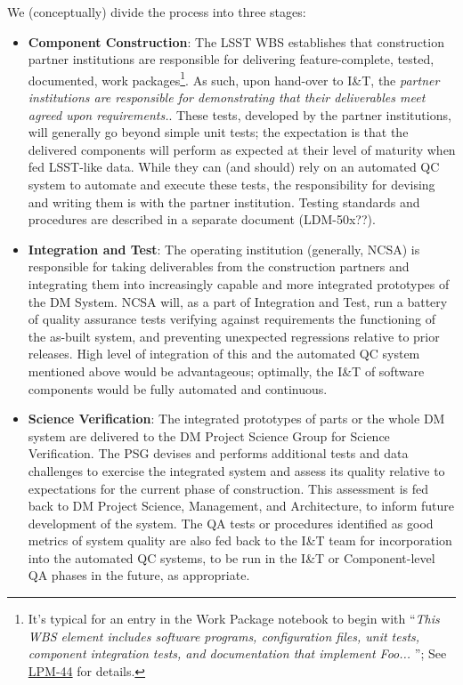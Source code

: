 We (conceptually) divide the process into three stages:
%
\begin{itemize}

\item {\bf Component Construction}: The LSST WBS establishes that construction
partner institutions are responsible for delivering feature-complete,
tested, documented, work packages\footnote{It's typical for an entry in the
Work Package notebook to begin with ``{\em This WBS element includes
software programs, configuration files, unit tests, component integration
tests, and documentation that implement Foo...  }''; See
\href{http://ls.st/LPM-44)}{LPM-44} for details.}.  As such, upon hand-over
to I\&T, the {\em partner institutions are responsible for demonstrating
that their deliverables meet agreed upon requirements.}.  These tests,
developed by the partner institutions, will generally go beyond simple unit
tests; the expectation is that the delivered components will perform as expected
at their level of maturity when fed LSST-like data.  While they can
(and should) rely on an automated QC system to automate and execute these
tests, the responsibility for devising and writing them is with the partner
institution. Testing standards and procedures are described in a separate
document (LDM-50x??).

\item {\bf Integration and Test}: The operating institution (generally,
NCSA) is responsible for taking deliverables from the construction partners
and integrating them into increasingly capable and more integrated
prototypes of the DM System.  NCSA will, as a part of Integration and Test,
run a battery of quality assurance tests verifying against requirements the
functioning of the as-built system, and preventing unexpected regressions
relative to prior releases.  High level of integration of this and the
automated QC system mentioned above would be advantageous; optimally, the
I\&T of software components would be fully automated and continuous.

\item {\bf Science Verification}: The integrated prototypes of parts or the
whole DM system are delivered to the DM Project Science Group for Science
Verification.  The PSG devises and performs additional tests and data
challenges to exercise the integrated system and assess its quality relative to
expectations for the current phase of construction.  This assessment is
fed back to DM Project Science, Management, and Architecture, to inform
future development of the system.  The QA tests or procedures identified
as good metrics of system quality are also fed back to the I\&T team for
incorporation into the automated QC systems, to be run in the I\&T or
Component-level QA phases in the future, as appropriate.

\end{itemize}

